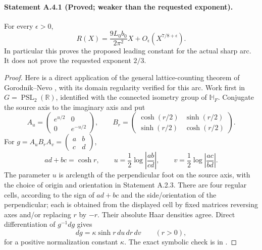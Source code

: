 \paragraph{Statement A.4.1 (Proved; weaker than the requested exponent).}
For every $\epsilon>0$,
\begin{equation}\label{A:sharp-7-8}
 R(X)=\frac{9L_0b_0}{2\pi^2}X+O_\epsilon(X^{7/8+\epsilon}).
\end{equation}
In particular this proves the proposed leading constant for the actual
sharp arc. It does not prove the requested exponent $2/3$.
\begin{proof}
Here is a direct application of the general lattice-counting theorem of
Gorodnik--Nevo \cite{GorodnikNevo2012}, with its domain regularity verified
for this arc. Work first in $G=\operatorname{PSL}_2(\mathbb R)$, identified
with the connected isometry group of $\mathbb H_F$. Conjugate the source
axis to the imaginary axis and put
\[
 A_u=\begin{pmatrix}e^{u/2}&0\\0&e^{-u/2}\end{pmatrix},\qquad
 B_r=\begin{pmatrix}\cosh(r/2)&\sinh(r/2)\\
                  \sinh(r/2)&\cosh(r/2)\end{pmatrix}.
\]
For $g=A_uB_rA_v=\begin{pmatrix}a&b\\c&d\end{pmatrix}$,
\[
 ad+bc=\cosh r,\qquad
 u=\frac12\log\left|\frac{ab}{cd}\right|,\qquad
 v=\frac12\log\left|\frac{ac}{bd}\right|.
\]
The parameter $u$ is arclength of the perpendicular foot on the source
axis, with the choice of origin and orientation in Statement A.2.3.
There are four regular cells, according to the sign of $ad+bc$ and the
side/orientation of the perpendicular; each is obtained from the displayed
cell by fixed matrices reversing axes and/or replacing $r$ by $-r$.
Their absolute Haar densities agree. Direct differentiation of
$g^{-1}dg$ gives
\begin{equation}\label{A:Haar-ABA}
 dg=\kappa\sinh r\,du\,dr\,dv\qquad(r>0),
\end{equation}
for a positive normalization constant $\kappa$. The exact symbolic check
is in .


\end{proof}
